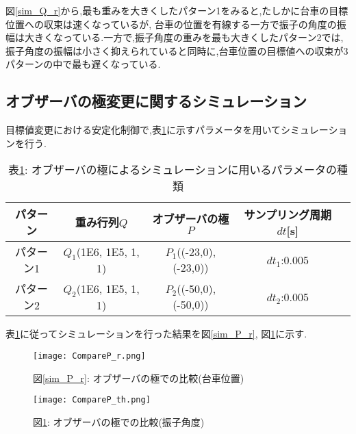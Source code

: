 図\ref{sim_Q_r}から,最も重みを大きくしたパターン1をみると,たしかに台車の目標位置への収束は速くなっているが,
台車の位置を有線する一方で振子の角度の振幅は大きくなっている.一方で,振子角度の重みを最も大きくしたパターン2では,
振子角度の振幅は小さく抑えられていると同時に,台車位置の目標値への収束が3パターンの中で最も遅くなっている.

\subsection{オブザーバの極変更に関するシミュレーション}
目標値変更における安定化制御で,表\ref{sim_P}に示すパラメータを用いてシミュレーションを行う.

\begin{table}[htbp]
    \begin{center}
        \caption{表\ref{sim_P}: オブザーバの極によるシミュレーションに用いるパラメータの種類}
        \begin{tabular}{|c|c|c|c|c|} \hline
            パターン & 重み行列$Q$ & オブザーバの極$P$ & サンプリング周期$dt$[s] \\ \hline \hline
            パターン1 & $Q_1$(1E6, 1E5, 1, 1) & $P_1$((-23,0), (-23,0)) & $dt_1$:0.005 \\ \hline
            パターン2 & $Q_2$(1E6, 1E5, 1, 1) & $P_2$((-50,0), (-50,0)) & $dt_2$:0.005 \\ \hline
        \end{tabular}
        \label{sim_P}
    \end{center}
\end{table}

表\ref{sim_P}に従ってシミュレーションを行った結果を図\ref{sim_P_r}, 図\ref{sim_P_th}に示す.

\begin{figure}[htbp]
    \begin{minipage}{0.5\hsize}
        \begin{center}
            \texttt{[image: CompareP\_r.png]}
            \caption{図\ref{sim_P_r}: オブザーバの極での比較(台車位置)}
            \label{sim_P_r}
        \end{center}
    \end{minipage}
    \begin{minipage}{0.5\hsize}
        \begin{center}
            \texttt{[image: CompareP\_th.png]}
            \caption{図\ref{sim_P_th}: オブザーバの極での比較(振子角度)}
            \label{sim_P_th}
        \end{center}
    \end{minipage}
\end{figure}

